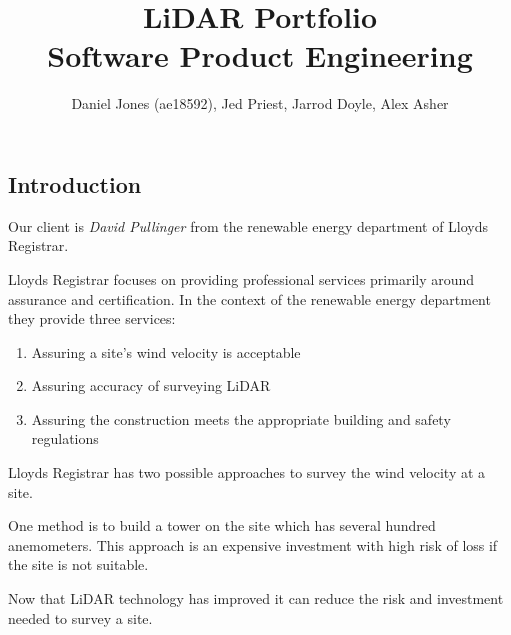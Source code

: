 \documentclass{article}
\title{LiDAR Portfolio\\\large Software Product Engineering}
\author{Daniel Jones (ae18592), Jed Priest, Jarrod Doyle, Alex Asher}
\date{}
\begin{document}
\maketitle
\begin{multicols}{2}
    \section{Introduction}
    Our client is \textit{David Pullinger} from the renewable energy department of Lloyds Registrar.
    \par Lloyds Registrar focuses on providing professional services primarily around assurance and certification. In the context of the renewable energy department they provide three services:
    \begin{enumerate}
        \item Assuring a site's wind velocity is acceptable
        \item Assuring accuracy of surveying LiDAR
        \item Assuring the construction meets the appropriate building and safety regulations
    \end{enumerate}
    Lloyds Registrar has two possible approaches to survey the wind velocity at a site. 
    \par One method is to build a tower on the site which has several hundred anemometers. This approach is an expensive investment with high risk of loss if the site is not suitable.
    \par Now that LiDAR technology has improved it can reduce the risk and investment needed to survey a site. 




\end{multicols}
\end{document}
